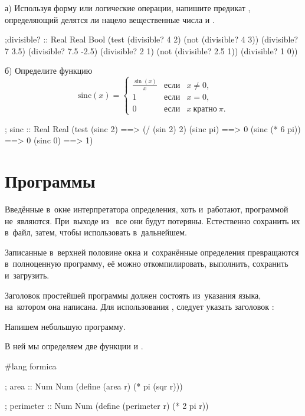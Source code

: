 \begin{Assignment}
а) Используя форму  или логические операции, напишите предикат , определяющий делятся ли нацело вещественные числа  и . 

\begin{Specification}
;divisible? :: Real Real \arrow Bool
(test
  (divisible? 4 2)
  (not (divisible? 4 3))
  (divisible? 7 3.5)
  (divisible? 7.5 -2.5)
  (divisible? 2 1)
  (not (divisible? 2.5 1))
  (divisible? 1 0))
\end{Specification}

б) Определите функцию 
\begin{equation*}
\mathrm{sinc}(x) = \left\{
\begin{array}{lll}
  \frac{\sin(x)}{x} &\text{если}& x \neq 0,\\
  1 &\text{если}& x = 0,\\
  0 &\text{если}& x~\text{кратно}~\pi.
\end{array}\right. 
\end{equation*}
 
\begin{Specification}
; sinc :: Real \arrow Real
(test
  (sinc 2)        ==> (/ (sin 2) 2)
  (sinc pi)       ==> 0
  (sinc (* 6 pi)) ==> 0
  (sinc 0)        ==> 1)
\end{Specification}
\end{Assignment}



\section[2]{Программы \Scheme}%
Введённые в~окне интерпретатора определения, хоть и~работают, программой не~являются. При~выходе из~ все они будут потеряны. Естественно сохранить их в~файл, затем, чтобы использовать в~дальнейшем.

Записанные в~верхней половине окна  и~сохранённые определения превращаются в~полноценную программу, её можно откомпилировать, выполнить, сохранить и~загрузить.

Заголовок простейшей программы должен состоять из~указания языка, на~котором она написана. Для использования \Scheme, следует указать заголовок :

\begin{example}{Напишем небольшую программу.

В ней мы определяем две функции  и .}
\begin{ExampleCode}[emph={r}]
#lang formica

; area :: Num \arrow Num
(define (area r)
  (* pi (sqr r)))

; perimeter :: Num \arrow Num
(define (perimeter r)
  (* 2 pi r))
\end{ExampleCode}
\end{example}

